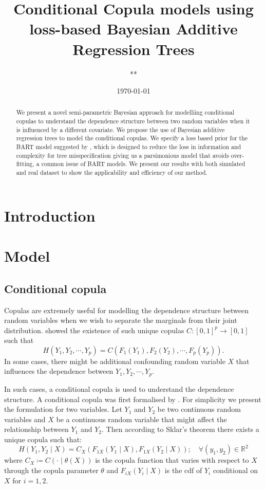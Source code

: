 \documentclass{amsart}
\title{Conditional Copula models using loss-based Bayesian Additive Regression Trees}
\author{**}
\date{\today}
\begin{document}
\begin{abstract}
	 We present a novel semi-parametric Bayesian approach for modelliing conditional copulas to understand the dependence structure between two random variables when it is influenced by a different covariate. We propose the use of Bayesian additive regression trees to model the conditional copulas. We specify a loss based prior for the BART model suggested by \citet{serafini2024lossbasedpriortreetopologies}, which is designed to reduce the loss in information and complexity for tree misspecification giving us a parsimonious model that avoids over-fitting, a common issue of BART models. We present our results with both simulated and real dataset to show the applicability and efficiency of our method.
\end{abstract}

\maketitle

\section{Introduction}

\section{Model}

\subsection{Conditional copula}

Copulas are extremely useful  for modelling the dependence structure between random variables when we wish to separate the marginals from their joint distribution. \citet{sklar:1959} showed the existence of such unique copulas $C:[0,1]^p\to [0,1]$ such that
\begin{equation*}
	H(Y_1,Y_2,\cdots, Y_p) = C(F_1(Y_1),F_2(Y_2),\cdots,F_p(Y_p)).
\end{equation*}
In some cases, there might be additional confounding random variable $X$ that influences the dependence between $Y_1,Y_2,\cdots, Y_p$. 

In such cases, a conditional copula is used to understand the dependence structure. A conditional copula was first formalised by \citet{patton2006}. For simplicity we present the formulation for two variables. Let $Y_1$ and $Y_2$ be two continuous random variables and $X$ be a continuous random variable that might affect the relationship between $Y_1$ and $Y_2$. Then according to Sklar’s theorem there exists a unique copula such that:
\begin{equation*}
	H(Y_1,Y_2\mid X) = C_X(F_{1X}(Y_1\mid X),F_{1X}(Y_2\mid X)); \quad \forall (y_1,y_2) \in \mathbb{R}^2
\end{equation*}
where $C_X \coloneqq C(\cdot\mid \theta(X))$ is the copula function that varies with respect to $X$ through the copula parameter $\theta$ and $F_{iX}(Y_i\mid X)$ is the cdf of $Y_i$ conditional on $X$ for $i=1,2$.
\end{document}

